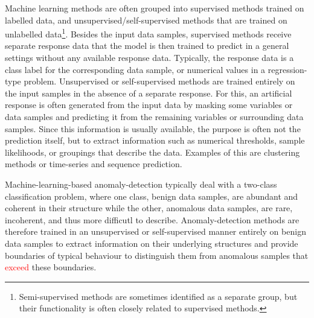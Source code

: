 Machine learning methods are often grouped into supervised methods trained on labelled data, and unsupervised/self-supervised methods that are trained on unlabelled data\footnote{Semi-supervised methods are sometimes identified as a separate group, but their functionality is often closely related to supervised methods.}. Besides the input data samples, supervised methods receive separate response data that the model is then trained to predict in a general settings without any available response data. Typically, the response data is a class label for the corresponding data sample, or numerical values in a regression-type problem. 
Unsupervised or self-supervised methods are trained entirely on the input samples in the absence of a separate response. For this, an artificial response is often generated from the input data by masking some variables or data samples and predicting it from the remaining variables or surrounding data samples. Since this information is usually available, the purpose is often not the prediction itself, but to extract information such as numerical thresholds, sample likelihoods, or groupings that describe the data. Examples of this are clustering methods or time-series and sequence prediction. 

Machine-learning-based anomaly-detection typically deal with a two-class classification problem, where one class, benign data samples, are abundant and coherent in their structure while the other, anomalous data samples, are rare, incoherent, and thus more difficutl to describe. Anomaly-detection methods are therefore trained in an unsupervised or self-supervised manner entirely on benign data samples to extract information on their underlying structures and provide boundaries of typical behaviour to distinguish them from anomalous samples that \textcolor{red}{exceed} these boundaries.

